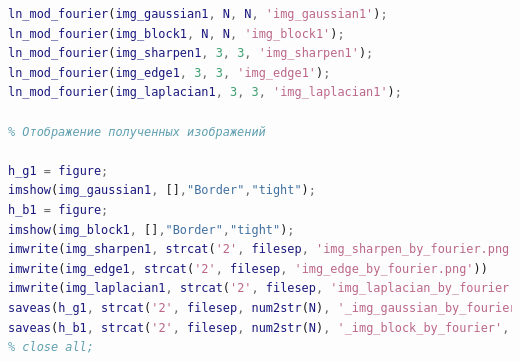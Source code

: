 \documentclass[a4paper]{article}
\begin{document}
\begin{lstlisting}[caption={Код для построения графиков для задания 2}, language=matlab]
ln_mod_fourier(img_gaussian1, N, N, 'img_gaussian1');
ln_mod_fourier(img_block1, N, N, 'img_block1');
ln_mod_fourier(img_sharpen1, 3, 3, 'img_sharpen1');
ln_mod_fourier(img_edge1, 3, 3, 'img_edge1');
ln_mod_fourier(img_laplacian1, 3, 3, 'img_laplacian1');

% Отображение полученных изображений

h_g1 = figure;
imshow(img_gaussian1, [],"Border","tight");
h_b1 = figure;
imshow(img_block1, [],"Border","tight");
imwrite(img_sharpen1, strcat('2', filesep, 'img_sharpen_by_fourier.png'))
imwrite(img_edge1, strcat('2', filesep, 'img_edge_by_fourier.png'))
imwrite(img_laplacian1, strcat('2', filesep, 'img_laplacian_by_fourier.png'))
saveas(h_g1, strcat('2', filesep, num2str(N), '_img_gaussian_by_fourier', '.png'), 'png')
saveas(h_b1, strcat('2', filesep, num2str(N), '_img_block_by_fourier', '.png'), 'png')
% close all;
\end{lstlisting}
\end{document}
